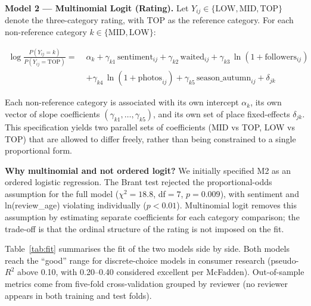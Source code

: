 \documentclass[10pt,a4paper]{article}
\newcommand{\sect}[1]{\vspace{10pt}\noindent{\Large\bfseries #1}\par\vspace{3pt}}
\newcommand{\subsect}[1]{\vspace{6pt}\noindent{\large\bfseries #1}\par\vspace{2pt}}
\begin{document}
\textbf{Model 2 --- Multinomial Logit (Rating).} Let
$Y_{ij} \in \{\text{LOW}, \text{MID}, \text{TOP}\}$ denote the
three-category rating, with TOP as the reference category. For each
non-reference category $k \in \{\text{MID}, \text{LOW}\}$:

\begin{align*}
\log\!\frac{P(Y_{ij} = k)}{P(Y_{ij} = \text{TOP})}
   = \; &\alpha_{k}
       + \gamma_{k1}\,\text{sentiment}_{ij}
       + \gamma_{k2}\,\text{waited}_{ij}
       + \gamma_{k3}\,\ln(1 + \text{followers}_{ij}) \\
    &+ \gamma_{k4}\,\ln(1 + \text{photos}_{ij})
       + \gamma_{k5}\,\text{season\_autumn}_{ij}
       + \delta_{jk}
\end{align*}

Each non-reference category is associated with its own intercept
$\alpha_{k}$, its own vector of slope coefficients
$(\gamma_{k1}, \ldots, \gamma_{k5})$, and its own set of place
fixed-effects $\delta_{jk}$. This specification yields two parallel
sets of coefficients (MID vs TOP, LOW vs TOP) that are allowed to
differ freely, rather than being constrained to a single proportional
form.

\textbf{Why multinomial and not ordered logit?} We initially specified M2
as an ordered logistic regression. The Brant test rejected the
proportional-odds assumption for the full model ($\chi^2 = 18.8$, df$=7$,
$p = 0.009$), with sentiment and ln(review\_age) violating individually
($p < 0.01$). Multinomial logit removes this assumption by estimating
separate coefficients for each category comparison; the trade-off is
that the ordinal structure of the rating is not imposed on the fit.

\sect{IV. Results}

\subsect{4.0 Model Fit Summary}

Table~\ref{tab:fit} summarises the fit of the two models side by side.
Both models reach the ``good'' range for discrete-choice models in
consumer research (pseudo-$R^2$ above 0.10, with 0.20--0.40 considered
excellent per McFadden). Out-of-sample metrics come from five-fold
cross-validation grouped by reviewer (no reviewer appears in both
training and test folds).
\end{document}
